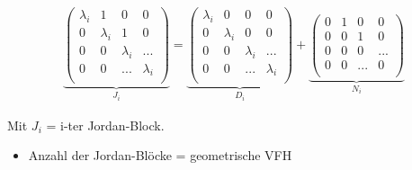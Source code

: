 \documentclass[10pt,a4paper]{article}
\begin{document}
  \begin{mdframed}[style=exercise]
    \begin{align}
\underbrace{ 
        \begin{pmatrix}
             \lambda_i& 1  & 0& 0 \\
             0 & \lambda_i & 1 & 0 \\
             0 & 0 & \lambda_i & ... \\
             0 & 0 & ... & \lambda_i \\
        \end{pmatrix} 
        }_{J_i} = 
\underbrace{ 
        \begin{pmatrix}
             \lambda_i& 0  & 0& 0 \\
             0 & \lambda_i & 0 & 0 \\
             0 & 0 & \lambda_i & ... \\
             0 & 0 & ... & \lambda_i \\
        \end{pmatrix} 
        }_{D_i} +
\underbrace{ 
        \begin{pmatrix}
             0 & 1  & 0& 0 \\
             0 & 0 & 1 & 0 \\
             0 & 0 & 0 & ... \\
             0 & 0 & ... & 0 \\
        \end{pmatrix} 
        }_{N_i}
    \end{align}
  \end{mdframed}
Mit $J_i$ = i-ter Jordan-Block. \\
\begin{itemize}
    \item Anzahl der Jordan-Blöcke = geometrische VFH
\end{itemize}
\end{document}

